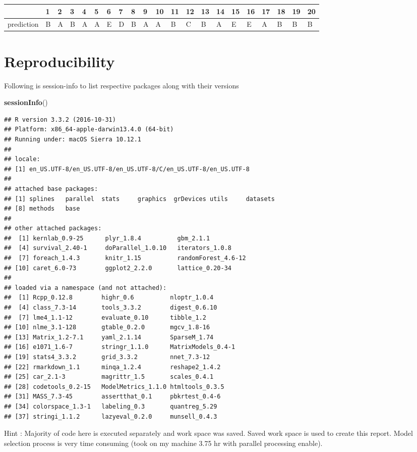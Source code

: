 \documentclass[]{article}
\newenvironment{Shaded}{\begin{snugshade}}{\end{snugshade}}
\newcommand{\KeywordTok}[1]{\textcolor[rgb]{0.13,0.29,0.53}{\textbf{{#1}}}}
\newcommand{\NormalTok}[1]{{#1}}
\begin{document}
\begin{longtable}[]{@{}lllllllllllllllllllll@{}}
\toprule
& 1 & 2 & 3 & 4 & 5 & 6 & 7 & 8 & 9 & 10 & 11 & 12 & 13 & 14 & 15 & 16 &
17 & 18 & 19 & 20\tabularnewline
\midrule
\endhead
prediction & B & A & B & A & A & E & D & B & A & A & B & C & B & A & E &
E & A & B & B & B\tabularnewline
\bottomrule
\end{longtable}

\section{Reproducibility}\label{reproducibility}

Following is session-info to list respective packages along with their
versions

\begin{Shaded}
\begin{Highlighting}[]
\KeywordTok{sessionInfo}\NormalTok{()}
\end{Highlighting}
\end{Shaded}

\begin{verbatim}
## R version 3.3.2 (2016-10-31)
## Platform: x86_64-apple-darwin13.4.0 (64-bit)
## Running under: macOS Sierra 10.12.1
## 
## locale:
## [1] en_US.UTF-8/en_US.UTF-8/en_US.UTF-8/C/en_US.UTF-8/en_US.UTF-8
## 
## attached base packages:
## [1] splines   parallel  stats     graphics  grDevices utils     datasets 
## [8] methods   base     
## 
## other attached packages:
##  [1] kernlab_0.9-25      plyr_1.8.4          gbm_2.1.1          
##  [4] survival_2.40-1     doParallel_1.0.10   iterators_1.0.8    
##  [7] foreach_1.4.3       knitr_1.15          randomForest_4.6-12
## [10] caret_6.0-73        ggplot2_2.2.0       lattice_0.20-34    
## 
## loaded via a namespace (and not attached):
##  [1] Rcpp_0.12.8        highr_0.6          nloptr_1.0.4      
##  [4] class_7.3-14       tools_3.3.2        digest_0.6.10     
##  [7] lme4_1.1-12        evaluate_0.10      tibble_1.2        
## [10] nlme_3.1-128       gtable_0.2.0       mgcv_1.8-16       
## [13] Matrix_1.2-7.1     yaml_2.1.14        SparseM_1.74      
## [16] e1071_1.6-7        stringr_1.1.0      MatrixModels_0.4-1
## [19] stats4_3.3.2       grid_3.3.2         nnet_7.3-12       
## [22] rmarkdown_1.1      minqa_1.2.4        reshape2_1.4.2    
## [25] car_2.1-3          magrittr_1.5       scales_0.4.1      
## [28] codetools_0.2-15   ModelMetrics_1.1.0 htmltools_0.3.5   
## [31] MASS_7.3-45        assertthat_0.1     pbkrtest_0.4-6    
## [34] colorspace_1.3-1   labeling_0.3       quantreg_5.29     
## [37] stringi_1.1.2      lazyeval_0.2.0     munsell_0.4.3
\end{verbatim}

Hint : Majority of code here is executed separately and work space was
saved. Saved work space is used to create this report. Model selection
process is very time consuming (took on my machine 3.75 hr with parallel
processing enable).
\end{document}
